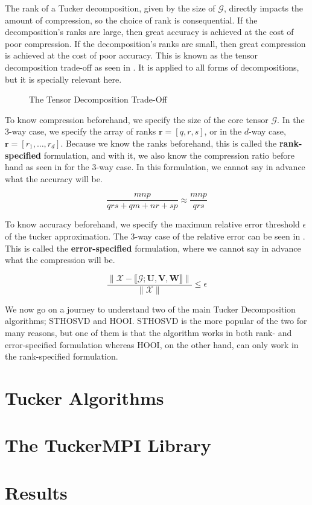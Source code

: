 
The rank of a Tucker decomposition, given by the size of $\mathcal{G}$, directly
impacts the amount of compression, so the choice of rank is consequential. If
the decomposition's ranks are large, then great accuracy is achieved at the cost
of poor compression. If the decomposition's ranks are small, then great
compression is achieved at the cost of poor accuracy. This is known as the
tensor decomposition trade-off as seen in
. It is applied to all forms of
decompositions, but it is specially relevant here. 

\begin{figure}[ht!]
    \centering
    
    \caption{The Tensor Decomposition Trade-Off}
    \label{fig:tensor_decomposition_trade_off}
\end{figure}

To know compression beforehand, we specify the size of the core tensor
$\mathcal{G}$. In the 3-way case, we specify the array of ranks $\mathbf{r} =
[q, r, s]$, or in the $d$-way case, $\mathbf{r} = [r_1, \hdots, r_d]$. Because
we know the ranks beforehand, this is called the \textbf{rank-specified}
formulation, and with it, we also know the compression ratio before hand as seen
in  for the 3-way case. In this formulation, we
cannot say in advance what the accuracy will be.

\begin{equation} \label{eq:compression_ratio}
    \frac{mnp}{qrs + qm + nr + sp} \approx \frac{mnp}{qrs}
\end{equation}

To know accuracy beforehand, we specify the maximum relative error threshold
$\epsilon$ of the tucker approximation. The 3-way case of the relative error can
be seen in . This is called the \textbf{error-specified}
formulation, where we cannot say in advance what the compression will be. 

\begin{equation} \label{eq:rel_error}
    \frac{\| \mathcal{X} - \llbracket \mathcal{G}; \mathbf{U, V, W} \rrbracket \|}{\|\mathcal{X}\|} \leq \epsilon
\end{equation}

We now go on a journey to understand two of the main Tucker Decomposition
algorithms; STHOSVD and HOOI. STHOSVD is the more popular of the two for many
reasons, but one of them is that the algorithm works in both rank- and
error-specified formulation whereas HOOI, on the other hand, can only work in
the rank-specified formulation. 


\section{Tucker Algorithms} \label{sec:Tucker Algorithms}
    

\section{The TuckerMPI Library}
    

\section{Results}
    